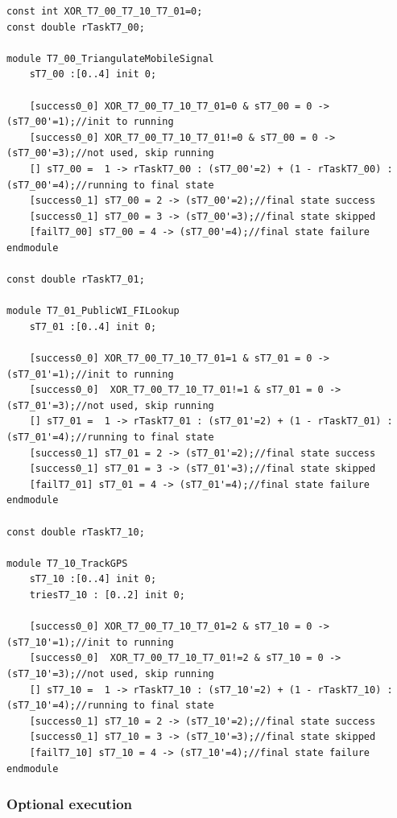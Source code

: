 \begin{lstlisting}[language=Prism, caption={Alternative tasks T7.00, T7.01 and T7.10 as DTMC modules with additional integer variable used for selection.},label={lst:PRISM_ALT_TSKS}] 
const int XOR_T7_00_T7_10_T7_01=0;
const double rTaskT7_00;

module T7_00_TriangulateMobileSignal
	sT7_00 :[0..4] init 0;
	
	[success0_0] XOR_T7_00_T7_10_T7_01=0 & sT7_00 = 0 -> (sT7_00'=1);//init to running
	[success0_0] XOR_T7_00_T7_10_T7_01!=0 & sT7_00 = 0 -> (sT7_00'=3);//not used, skip running
	[] sT7_00 =  1 -> rTaskT7_00 : (sT7_00'=2) + (1 - rTaskT7_00) : (sT7_00'=4);//running to final state
	[success0_1] sT7_00 = 2 -> (sT7_00'=2);//final state success
	[success0_1] sT7_00 = 3 -> (sT7_00'=3);//final state skipped
	[failT7_00] sT7_00 = 4 -> (sT7_00'=4);//final state failure
endmodule

const double rTaskT7_01;

module T7_01_PublicWI_FILookup
	sT7_01 :[0..4] init 0;
	
	[success0_0] XOR_T7_00_T7_10_T7_01=1 & sT7_01 = 0 -> (sT7_01'=1);//init to running
	[success0_0]  XOR_T7_00_T7_10_T7_01!=1 & sT7_01 = 0 -> (sT7_01'=3);//not used, skip running	
	[] sT7_01 =  1 -> rTaskT7_01 : (sT7_01'=2) + (1 - rTaskT7_01) : (sT7_01'=4);//running to final state
	[success0_1] sT7_01 = 2 -> (sT7_01'=2);//final state success
	[success0_1] sT7_01 = 3 -> (sT7_01'=3);//final state skipped
	[failT7_01] sT7_01 = 4 -> (sT7_01'=4);//final state failure
endmodule

const double rTaskT7_10;

module T7_10_TrackGPS
	sT7_10 :[0..4] init 0;
	triesT7_10 : [0..2] init 0;

	[success0_0] XOR_T7_00_T7_10_T7_01=2 & sT7_10 = 0 -> (sT7_10'=1);//init to running
	[success0_0]  XOR_T7_00_T7_10_T7_01!=2 & sT7_10 = 0 -> (sT7_10'=3);//not used, skip running
	[] sT7_10 =  1 -> rTaskT7_10 : (sT7_10'=2) + (1 - rTaskT7_10) : (sT7_10'=4);//running to final state
	[success0_1] sT7_10 = 2 -> (sT7_10'=2);//final state success
	[success0_1] sT7_10 = 3 -> (sT7_10'=3);//final state skipped
	[failT7_10] sT7_10 = 4 -> (sT7_10'=4);//final state failure
endmodule
\end{lstlisting}

\subsubsection{Optional execution}

